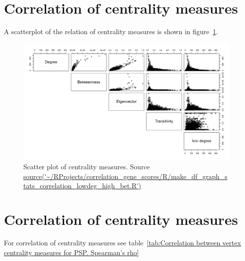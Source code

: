 \section{Correlation of centrality measures}

A scatterplot of the relation of centrality measures is shown in figure~\ref{fig:scatter plot of multiple centrality measures}.

\begin{figure} 
    \centering
    \includegraphics[width=\textwidth]{images/Rplot_pairs_plot.png}
    \caption{Scatter plot of centrality measures. Source \url{source('~/RProjects/correlation_gene_scores/R/make_df_graph_stats_correlation_lowdeg_high_bet.R')}}
    \label{fig:scatter plot of multiple centrality measures}
\end{figure}

\section{Correlation of centrality measures}

For correlation of centrality measures see table~\ref{tab:Correlation between vertex centrality measures for PSP. Spearman's rho}


 

